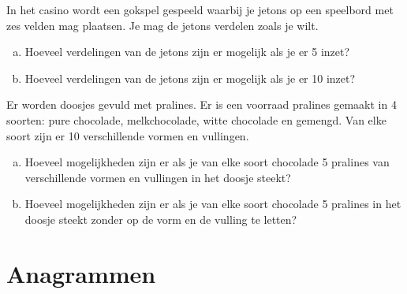 \documentclass[12pt,twoside]{article}
\begin{document}
\begin{oefening}
In het casino wordt een gokspel gespeeld waarbij je jetons op een speelbord met zes velden mag plaatsen. Je mag de jetons verdelen zoals je wilt.
\begin{enumerate}[(a)]
  \item Hoeveel verdelingen van de jetons zijn er mogelijk als je er 5 inzet?
  \item Hoeveel verdelingen van de jetons zijn er mogelijk als je er 10 inzet?
\end{enumerate}
\end{oefening}

\begin{oefening}
Er worden doosjes gevuld met pralines. Er is een voorraad pralines gemaakt in 4 soorten: pure chocolade, melkchocolade, witte chocolade en gemengd. Van elke soort zijn er 10 verschillende vormen en vullingen.
\begin{enumerate}[(a)]
  \item Hoeveel mogelijkheden zijn er als je van elke soort chocolade 5 pralines van verschillende vormen en vullingen in het doosje steekt?
  \item Hoeveel mogelijkheden zijn er als je van elke soort chocolade 5 pralines in het doosje steekt zonder op de vorm en de vulling te letten?
\end{enumerate}
\end{oefening}

\pagebreak
\section{Anagrammen}
\end{document}
